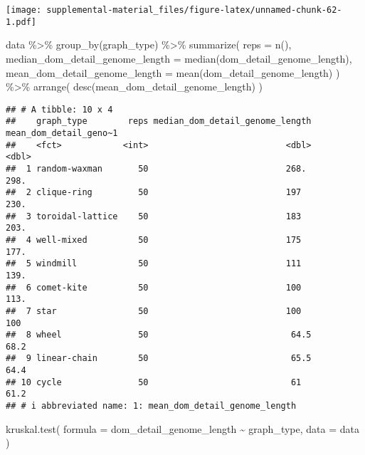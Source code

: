 \documentclass[
]{book}
\newenvironment{Shaded}{\begin{snugshade}}{\end{snugshade}}
\newcommand{\AttributeTok}[1]{\textcolor[rgb]{0.77,0.63,0.00}{#1}}
\newcommand{\FunctionTok}[1]{\textcolor[rgb]{0.00,0.00,0.00}{#1}}
\newcommand{\NormalTok}[1]{#1}
\newcommand{\SpecialCharTok}[1]{\textcolor[rgb]{0.00,0.00,0.00}{#1}}
\begin{document}
\texttt{[image: supplemental-material\_files/figure-latex/unnamed-chunk-62-1.pdf]}

\begin{Shaded}
\begin{Highlighting}[]
\NormalTok{data }\SpecialCharTok{\%\textgreater{}\%}
  \FunctionTok{group\_by}\NormalTok{(graph\_type) }\SpecialCharTok{\%\textgreater{}\%}
  \FunctionTok{summarize}\NormalTok{(}
    \AttributeTok{reps =} \FunctionTok{n}\NormalTok{(),}
    \AttributeTok{median\_dom\_detail\_genome\_length =} \FunctionTok{median}\NormalTok{(dom\_detail\_genome\_length),}
    \AttributeTok{mean\_dom\_detail\_genome\_length =} \FunctionTok{mean}\NormalTok{(dom\_detail\_genome\_length)}
\NormalTok{  ) }\SpecialCharTok{\%\textgreater{}\%}
  \FunctionTok{arrange}\NormalTok{(}
    \FunctionTok{desc}\NormalTok{(mean\_dom\_detail\_genome\_length)}
\NormalTok{  )}
\end{Highlighting}
\end{Shaded}

\begin{verbatim}
## # A tibble: 10 x 4
##    graph_type        reps median_dom_detail_genome_length mean_dom_detail_geno~1
##    <fct>            <int>                           <dbl>                  <dbl>
##  1 random-waxman       50                           268.                   298. 
##  2 clique-ring         50                           197                    230. 
##  3 toroidal-lattice    50                           183                    203. 
##  4 well-mixed          50                           175                    177. 
##  5 windmill            50                           111                    139. 
##  6 comet-kite          50                           100                    113. 
##  7 star                50                           100                    100  
##  8 wheel               50                            64.5                   68.2
##  9 linear-chain        50                            65.5                   64.4
## 10 cycle               50                            61                     61.2
## # i abbreviated name: 1: mean_dom_detail_genome_length
\end{verbatim}

\begin{Shaded}
\begin{Highlighting}[]
\FunctionTok{kruskal.test}\NormalTok{(}
  \AttributeTok{formula =}\NormalTok{ dom\_detail\_genome\_length }\SpecialCharTok{\textasciitilde{}}\NormalTok{ graph\_type,}
  \AttributeTok{data =}\NormalTok{ data}
\NormalTok{)}
\end{Highlighting}
\end{Shaded}
\end{document}
